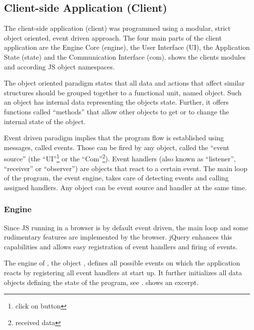 \subsection{Client-side Application (Client)}
\label{sec:client}

The client-side application (client) was programmed using a modular, strict object oriented, event driven approach.
The four main parts of the client application are the Engine Core (engine), the User Interface (UI), the Application State (state) and the Communication Interface (com).
 shows the clients modules and according JS object namespaces.


The object oriented paradigm states that all data and actions that affect similar structures should be grouped together to a functional unit, named object.
Such an object has internal data representing the objects state.
Further, it offers functions called ``methods'' that allow other objects to get or to change the internal state of the object.

Event driven paradigm implies that the program flow is established using messages, called events.
Those can be fired by any object, called the ``event source'' (the ``UI''\footnote{click on button} or the ``Com''\footnote{received data}).
Event handlers (also known as ``listener'', ``receiver'' or ``observer'') are objects that react to a certain event.
The main loop of the program, the event engine, takes care of detecting events and calling assigned handlers.
Any object can be event source and handler at the same time.


\subsubsection{Engine}
\label{sec:engine}

Since JS running in a browser is by default event driven, the main loop and some rudimentary features are implemented by the browser.
jQuery enhances this capabilities and allows easy registration of event handlers and firing of events.

The engine of \spl, the object , defines all possible events on which the application reacts by registering all event handlers at start up.
It further initializes all data objects defining the state of the program, see .
 shows an excerpt.

